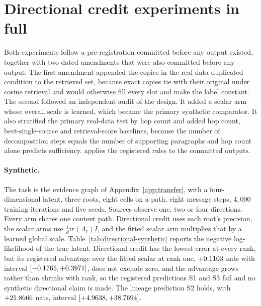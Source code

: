 \documentclass{article}
\begin{document}
\begin{table}[h]
\centering\small
\caption{Gold-answer recall in every syndication condition, $300$ records,
Qwen2.5-7B-Instruct.}
\label{tab:synd-full}
\end{table}

\section{Directional credit experiments in full}
\label{app:directional}

Both experiments follow a pre-registration committed before any output existed,
together with two dated amendments that were also committed before any output.
The first amendment appended the copies in the real-data duplicated condition to
the retrieved set, because exact copies tie with their original under cosine
retrieval and would otherwise fill every slot and make the label constant. The
second followed an independent audit of the design. It added a scalar arm whose
overall scale is learned, which became the primary synthetic comparator. It also
stratified the primary real-data test by hop count and added hop count,
best-single-source and retrieval-score baselines, because the number of
decomposition steps equals the number of supporting paragraphs and hop count
alone predicts sufficiency.  applies the
registered rules to the committed outputs.

\paragraph{Synthetic.} The task is the evidence graph of
Appendix~\ref{app:transfer}, with a four-dimensional latent, three roots, eight
cells on a path, eight message steps, $4{,}000$ training iterations and five
seeds. Sources observe one, two or four directions. Every arm shares one content
path. Directional credit uses each root's precision, the scalar arms use
$\tfrac{1}{d}\mathrm{tr}(\Lambda_r)I$, and the fitted scalar arm multiplies that
by a learned global scale. Table~\ref{tab:directional-synthetic} reports the
negative log-likelihood of the true latent. Directional credit has the lowest
error at every rank, but its registered advantage over the fitted scalar at rank
one, $+0.1103$ nats with interval $[-0.1765, +0.3971]$, does not exclude zero,
and the advantage grows rather than shrinks with rank, so the registered
predictions S1 and S3 fail and no synthetic directional claim is made. The
lineage prediction S2 holds, with $+21.8666$ nats, interval $[+4.9638, +38.7694]$.
\end{document}
